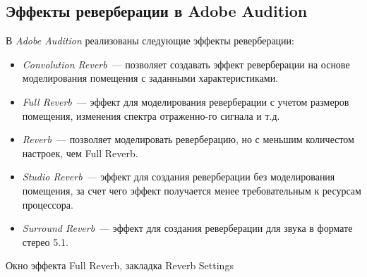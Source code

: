 \documentclass{beamer}
\begin{document}
\subsection{Эффекты реверберации в Adobe Audition}
\begin{frame}
  В \emph{Adobe Audition} реализованы следующие эффекты реверберации:
  \begin{itemize}
    \item \emph{Convolution Reverb}~--- позволяет создавать эффект реверберации на основе моделирования помещения с заданными характеристиками.
    \item \emph{Full Reverb}~--- эффект для моделирования реверберации с учетом размеров помещения, изменения спектра отраженно-го сигнала и т.д.
    \item \emph{Reverb}~--- позволяет моделировать реверберацию, но с меньшим количестом настроек, чем Full Reverb.
    \item \emph{Studio Reverb}~--- эффект для создания реверберации без моделирования помещения, за счет чего эффект получается менее требовательным к ресурсам процессора.
    \item \emph{Surround Reverb}~--- эффект для создания реверберации для звука в формате стерео 5.1.
  \end{itemize}  
\end{frame}

\begin{frame}
  \begin{block}{Окно эффекта Full Reverb, закладка Reverb Settings}
  \end{block}
\end{frame}
\end{document}

